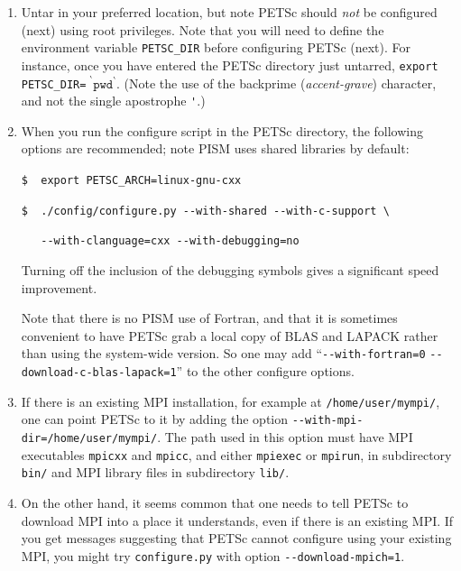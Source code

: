 \documentclass[11pt,final]{amsart}
\newcommand{\und}{\_\!\_}
\begin{document}
\begin{enumerate}
\renewcommand{\labelenumii}{(\roman{enumii})}\begin{enumerate}
\item Untar in your preferred location, but note PETSc should \emph{not} be configured (next) using root privileges.  Note that you will need to define the environment variable \verb|PETSC_DIR|\index{PETSC\und DIR} before configuring PETSc (next).  For instance, once you have entered the PETSc directory just untarred, \verb|export PETSC_DIR=|$\phantom{!}^\backprime \mathtt{pwd}^\backprime$.  (Note the use of the backprime (\emph{accent-grave}) character, and not the single apostrophe \verb|'|.)

\item When you run the configure script in the PETSc directory, the following options are recommended; note PISM uses shared libraries by default:\index{PETSC\und ARCH}

\verb|$  export PETSC_ARCH=linux-gnu-cxx|

\verb|$  ./config/configure.py --with-shared --with-c-support \|

\verb|   --with-clanguage=cxx --with-debugging=no|

Turning off the inclusion of the debugging symbols gives a significant speed improvement.

Note that there is no PISM use of Fortran, and that it is sometimes convenient to have PETSc grab a local copy of BLAS and LAPACK rather than using the system-wide version.  So one may add ``\verb|--with-fortran=0| \verb|--download-c-blas-lapack=1|'' to the other configure options.

\item If there is an existing MPI installation, for example at \verb|/home/user/mympi/|, one can point PETSc to it by adding the option \verb|--with-mpi-dir=/home/user/mympi/|.  The path used in this option must have MPI executables \verb|mpicxx| and \verb|mpicc|, and either \verb|mpiexec| or \verb|mpirun|, in subdirectory \verb|bin/| and MPI library files in subdirectory \verb|lib/|.

\item On the other hand, it seems common that one needs to tell PETSc to download MPI into a place it understands, even if there is an existing MPI.  If you get messages suggesting that PETSc cannot configure using your existing MPI, you might try \verb|configure.py| with option \verb|--download-mpich=1|.


\end{enumerate}
\end{enumerate}
\end{document}
